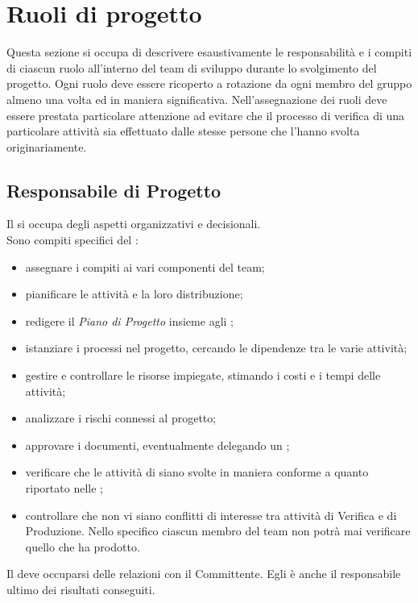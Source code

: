 \section{Ruoli di progetto}

Questa sezione si occupa di descrivere esaustivamente le responsabilità e i compiti di ciascun ruolo all'interno del team di sviluppo durante lo svolgimento del progetto.
Ogni ruolo deve essere ricoperto a rotazione da ogni membro del gruppo almeno una volta ed in maniera significativa. Nell'assegnazione dei ruoli deve essere prestata particolare attenzione ad evitare che il processo di verifica di una particolare attività sia effettuato dalle stesse persone che l'hanno svolta originariamente.


\subsection{Responsabile di Progetto} \label{sec:responsabile}
Il \Responsabile\space si occupa degli aspetti organizzativi e decisionali.\\
Sono compiti specifici del \Responsabile:
\begin{itemize}
	\item assegnare i compiti ai vari componenti del team;
	\item pianificare le attività e la loro distribuzione;
	\item redigere il \textit{Piano di Progetto} insieme agli \Amministratori;
	\item istanziare i processi nel progetto, cercando le dipendenze tra le varie attività;
	\item gestire e controllare le risorse impiegate, stimando i costi e i tempi delle attività;
	\item analizzare i rischi connessi al progetto;
	\item approvare i documenti, eventualmente delegando un \Verificatore;
	\item verificare che le attività di \VV\space siano svolte in maniera conforme a quanto riportato nelle \NormeDiProgetto;
	\item controllare che non vi siano conflitti di interesse tra attività di Verifica e di Produzione. Nello specifico ciascun membro del team non potrà mai verificare quello che ha prodotto.
\end{itemize}
Il \Responsabile\space deve occuparsi delle relazioni con il Committente.
Egli è anche il responsabile ultimo dei risultati conseguiti.


